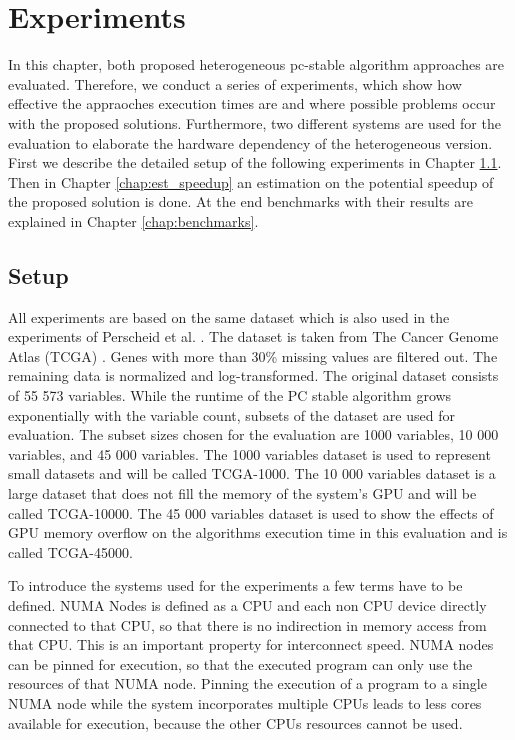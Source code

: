 \chapter{Experiments}
\label{chap:experiments}
In this chapter, both proposed heterogeneous pc-stable algorithm approaches are evaluated. Therefore, we conduct a series of experiments, which show how effective the appraoches execution times are and where possible problems occur with the proposed solutions. Furthermore, two different systems are used for the evaluation to elaborate the hardware dependency of the heterogeneous version. First we describe the detailed setup of the following experiments in Chapter \ref{chap:setup}. Then in Chapter \ref{chap:est_speedup} an estimation on the potential speedup of the proposed solution is done. At the end benchmarks with their results are explained in Chapter \ref{chap:benchmarks}.

\section{Setup}
\label{chap:setup}
All experiments are based on the same dataset which is also used in the experiments of Perscheid et al. \cite{perscheidIntegrativeGeneSelection2018}. The dataset is taken from The Cancer Genome Atlas (TCGA) \cite{weinsteinCancerGenomeAtlas2013}. Genes with more than 30\% missing values are filtered out. The remaining data is normalized and log-transformed. The original dataset consists of 55 573 variables. While the runtime of the PC stable algorithm grows exponentially with the variable count, subsets of the dataset are used for evaluation. The subset sizes chosen for the evaluation are 1000 variables, 10 000 variables, and 45 000 variables. The 1000 variables dataset is used to represent small datasets and will be called TCGA-1000. The 10 000 variables dataset is a large dataset that does not fill the memory of the system's GPU and will be called TCGA-10000. The 45 000 variables dataset is used to show the effects of GPU memory overflow on the algorithms execution time in this evaluation and is called TCGA-45000.

To introduce the systems used for the experiments a few terms have to be defined. NUMA Nodes is defined as a CPU and each non CPU device directly connected to that CPU, so that there is no indirection in memory access from that CPU. This is an important property for interconnect speed. NUMA nodes can be pinned for execution, so that the executed program can only use the resources of that NUMA node. Pinning the execution of a program to a single NUMA node while the system incorporates multiple CPUs leads to less cores available for execution, because the other CPUs resources cannot be used.

